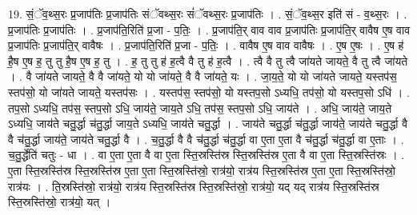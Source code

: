 \documentclass[17pt]{extarticle}
\begin{document}
19. सं॒ॅव॒थ्स॒रः प्र॒जाप॑तिः प्र॒जाप॑तिः संॅवथ्स॒रः सं॑ॅवथ्स॒रः प्र॒जाप॑तिः । . सं॒ॅव॒थ्स॒र इति॑ सं - व॒थ्स॒रः । . प्र॒जाप॑तिः प्र॒जाप॑तिः । . प्र॒जाप॑ति॒रिति॑ प्र॒जा - प॒तिः॒ । . प्र॒जाप॑ति॒र् वाव वाव प्र॒जाप॑तिः प्र॒जाप॑ति॒र् वावैष ए॒ष वाव प्र॒जाप॑तिः प्र॒जाप॑ति॒र् वावैषः । . प्र॒जाप॑ति॒रिति॑ प्र॒जा - प॒तिः॒ । . वावैष ए॒ष वाव वावैषः । . ए॒ष ए॒षः । . ए॒ष ह॑ है॒ष ए॒ष ह॒ तु तु है॒ष ए॒ष ह॒ तु । . ह॒ तु तु ह॑ ह॒त्वै वै तु ह॑ ह॒त्वै । . त्वै वै तु त्वै जा॑यते जायते॒ वै तु त्वै जा॑यते । . वै जा॑यते जायते॒ वै वै जा॑यते॒ यो यो जा॑यते॒ वै वै जा॑यते॒ यः । . जा॒य॒ते॒ यो यो जा॑यते जायते॒ यस्तप॑स॒ स्तप॑सो॒ यो जा॑यते जायते॒ यस्तप॑सः । . यस्तप॑स॒ स्तप॑सो॒ यो यस्तप॒सो ऽध्यधि॒ तप॑सो॒ यो यस्तप॒सो ऽधि॑ । . तप॒सो ऽध्यधि॒ तप॑स॒ स्तप॒सो ऽधि॒ जाय॑ते॒ जाय॒ते ऽधि॒ तप॑स॒ स्तप॒सो ऽधि॒ जाय॑ते । . अधि॒ जाय॑ते॒ जाय॒ते ऽध्यधि॒ जाय॑ते चतु॒र्द्धा च॑तु॒र्द्धा जाय॒ते ऽध्यधि॒ जाय॑ते चतु॒र्द्धा । . जाय॑ते चतु॒र्द्धा च॑तु॒र्द्धा जाय॑ते॒ जाय॑ते चतु॒र्द्धा वै वै च॑तु॒र्द्धा जाय॑ते॒ जाय॑ते चतु॒र्द्धा वै । . च॒तु॒र्द्धा वै वै च॑तु॒र्द्धा च॑तु॒र्द्धा वा ए॒ता ए॒ता वै च॑तु॒र्द्धा च॑तु॒र्द्धा वा ए॒ताः । . च॒तु॒र्द्धेति॑ चतुः - धा । . वा ए॒ता ए॒ता वै वा ए॒ता स्ति॒स्रस्ति॑स्र स्ति॒स्रस्ति॑स्र ए॒ता वै वा ए॒ता स्ति॒स्रस्ति॑स्रः । . ए॒ता स्ति॒स्रस्ति॑स्र स्ति॒स्रस्ति॑स्र ए॒ता ए॒ता स्ति॒स्रस्ति॑स्रो॒ रात्र॑यो॒ रात्र॑य स्ति॒स्रस्ति॑स्र ए॒ता ए॒ता स्ति॒स्रस्ति॑स्रो॒ रात्र॑यः । . ति॒स्रस्ति॑स्रो॒ रात्र॑यो॒ रात्र॑य स्ति॒स्रस्ति॑स्र स्ति॒स्रस्ति॑स्रो॒ रात्र॑यो॒ यद् यद् रात्र॑य स्ति॒स्रस्ति॑स्र स्ति॒स्रस्ति॑स्रो॒ रात्र॑यो॒ यत् । \newline
\end{document}
